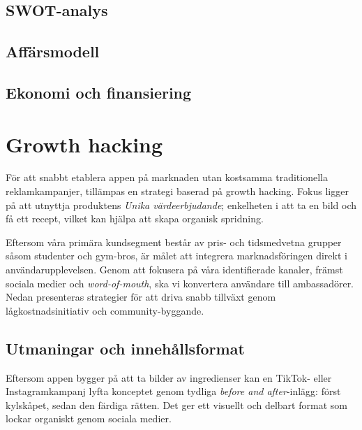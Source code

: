 \documentclass[a4paper,12pt]{article}
\begin{document}
\subsection{SWOT-analys}


\subsection{Affärsmodell}


\subsection{Ekonomi och finansiering}


\section{Growth hacking}
För att snabbt etablera appen på marknaden utan kostsamma traditionella reklamkampanjer, tillämpas en strategi baserad på growth hacking. Fokus ligger på att utnyttja produktens \textit{Unika värdeerbjudande}; enkelheten i att ta en bild och få ett recept, vilket kan hjälpa att skapa organisk spridning.

Eftersom våra primära kundsegment består av pris- och tidsmedvetna grupper såsom studenter och gym-bros, är målet att integrera marknadsföringen direkt i användarupplevelsen. Genom att fokusera på våra identifierade kanaler, främst sociala medier och \textit{word-of-mouth}, ska vi konvertera användare till ambassadörer. Nedan presenteras strategier för att driva snabb tillväxt genom lågkostnadsinitiativ och community-byggande.

\subsection{Utmaningar och innehållsformat}
Eftersom appen bygger på att ta bilder av ingredienser kan en TikTok- eller Instagramkampanj lyfta konceptet genom tydliga \textit{before and after}-inlägg: först kylskåpet, sedan den färdiga rätten. Det ger ett visuellt och delbart format som lockar organiskt genom sociala medier.
\end{document}
